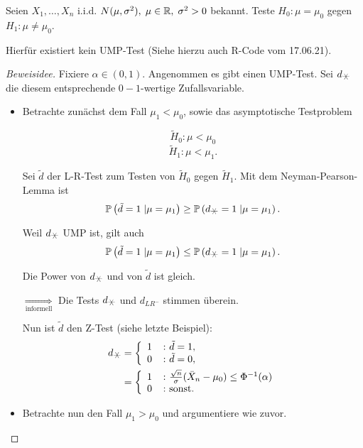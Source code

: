 \documentclass{tstextbook}
\begin{document}
\begin{example}
	 Seien $ X_1,\ldots,X_n $ i.i.d. $ N(\mu,\sigma^2), \; \mu\in\mathbb R , \; \sigma^2>0 $ bekannt. Teste $ H_0\colon \mu=\mu_0 $ gegen $ H_1\colon \mu\ne\mu_0 $.
	
	Hierfür existiert kein UMP-Test (Siehe hierzu auch R-Code vom 17.06.21).


\begin{proof}[Beweisidee]
	Fixiere $ \alpha\in(0,1) $. Angenommen es gibt einen UMP-Test. Sei $ d_{\hexstar} $ die diesem entsprechende $ 0-1 $-wertige Zufallsvariable.
	
	\begin{itemize}
		\item Betrachte zunächst dem Fall $\mu_1<\mu_0$, sowie das asymptotische Testproblem
		
		\[
		\tilde{H}_0\colon \mu<\mu_0
		\]
		\[
		\tilde{H}_1\colon \mu<\mu_1.
		\]
		
		Sei $\tilde{d}$ der L-R-Test zum Testen von $\tilde{H}_0$ gegen $\tilde{H}_1$. Mit dem Neyman-Pearson-Lemma ist 
		\[
		\Prob\left(\tilde{d}=1\; |\mu=\mu_1\right) \ge \Prob\left(d_{\hexstar}=1\; |\mu=\mu_1\right).
		\]
		
		Weil $ d_{\hexstar} $ UMP ist, gilt auch 
		\[
		\Prob\left(\tilde{d}=1\; |\mu=\mu_1\right) \le \Prob\left(d_{\hexstar}=1\; |\mu=\mu_1\right).
		\]
		
		Die Power von $ d_{\hexstar} $ und von $ \tilde{d} $ ist gleich. 
		
		$ \underset{\text{informell}}{\Rightarrow} $ Die Tests $ d_{\hexstar} $ und $ d_{LR^-} $ stimmen überein.
		
		Nun ist $\tilde{d}$ den Z-Test (siehe letzte Beispiel): 
		\[
		\begin{aligned}
			d_{\hexstar} & = \left\{\begin{array}{ll}
				1 & \colon \tilde{d}=1, \\
				0 & \colon \tilde{d}=0,
			\end{array}\right. \\
			& = \left\{\begin{array}{ll}
				1 & \colon \frac{\sqrt{n}}{\sigma}(\bar{X}_n-\mu_0)\le\Phi^{-1}(\alpha) \\
				0 & \colon \text{sonst}.
			\end{array}\right.
		\end{aligned}
		\]
		
		\item Betrachte nun den Fall $\mu_1>\mu_0$ und argumentiere wie zuvor.
		

\end{itemize}
\end{proof}
\end{example}
\end{document}
